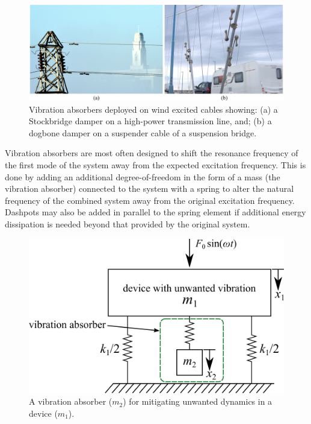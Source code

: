 \documentclass[12pt,letter]{article}
\begin{document}
\begin{figure}[H]
    \centering
    \includegraphics[width=6.5in]{../figures/vibration_absorbers}
    \caption{Vibration absorbers deployed on wind excited cables showing: (a) a Stockbridge damper on a high-power transmission line\protect\footnotemark[1], and; (b) a dogbone damper on a suspender cable of a suspension bridge\protect\footnotemark[2].}
    \label{fig:vibration_absorbers}
\end{figure}

Vibration absorbers are most often designed to shift the resonance frequency of the first mode of the system away from the expected excitation frequency. This is done by adding an additional degree-of-freedom in the form of a mass (the vibration absorber) connected to the system with a spring to alter the natural frequency of the combined system away from the original excitation frequency. Dashpots may also be added in parallel to the spring element if additional energy dissipation is needed beyond that provided by the original system. 

\begin{figure}[H]
    \centering
    \includegraphics[]{../figures/vibration_absorber_spring_mass.png}
    \caption{A vibration absorber ($m_2$) for mitigating unwanted dynamics in a device ($m_1$).}
    \label{fig:vibration_absorber_spring_mass}
\end{figure}
\end{document}
